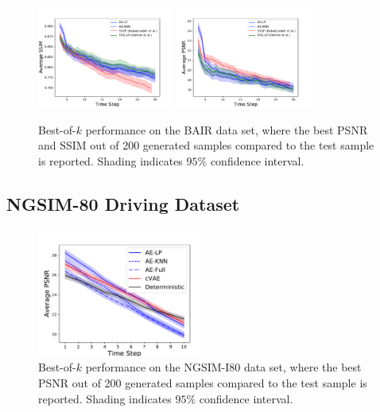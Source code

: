 \documentclass{article}
\begin{document}
\begin{figure}
  \centering
  \includegraphics[width=0.4\textwidth]{images/bair_ssim.pdf}
  \includegraphics[width=0.4\textwidth]{images/bair_psnr.pdf}
  \caption{Best-of-$k$ performance on the BAIR data set, where the best PSNR and SSIM out of 200 generated samples compared to the test sample is reported. Shading indicates $95\%$ confidence interval. }
  \label{bair}
\end{figure}


\subsection{NGSIM-80 Driving Dataset}




\begin{figure}
  \centering
  \includegraphics[width=0.5\textwidth]{images/best_of_k_i80.pdf}
  \caption{Best-of-$k$ performance on the NGSIM-I80 data set, where the best PSNR out of 200 generated samples compared to the test sample is reported. Shading indicates $95\%$ confidence interval. }
  \label{bair}
\end{figure}
\end{document}
